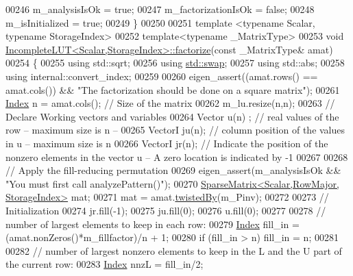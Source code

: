 \begin{DoxyCode}
00246   m\_analysisIsOk = \textcolor{keyword}{true};
00247   m\_factorizationIsOk = \textcolor{keyword}{false};
00248   m\_isInitialized = \textcolor{keyword}{true};
00249 \}
00250 
00251 \textcolor{keyword}{template} <\textcolor{keyword}{typename} Scalar, \textcolor{keyword}{typename} StorageIndex>
00252 \textcolor{keyword}{template}<\textcolor{keyword}{typename} \_MatrixType>
00253 \textcolor{keywordtype}{void} \hyperlink{group___iterative_linear_solvers___module_class_eigen_1_1_incomplete_l_u_t}{IncompleteLUT<Scalar,StorageIndex>::factorize}(\textcolor{keyword}{const} 
      \_MatrixType& amat)
00254 \{
00255   \textcolor{keyword}{using} std::sqrt;
00256   \textcolor{keyword}{using} \hyperlink{endian_8c_a3ca5ecd34b04d6a243c054ac3a57f68d}{std::swap};
00257   \textcolor{keyword}{using} std::abs;
00258   \textcolor{keyword}{using} internal::convert\_index;
00259 
00260   eigen\_assert((amat.rows() == amat.cols()) && \textcolor{stringliteral}{"The factorization should be done on a square matrix"});
00261   \hyperlink{namespace_eigen_a62e77e0933482dafde8fe197d9a2cfde}{Index} n = amat.cols();  \textcolor{comment}{// Size of the matrix}
00262   m\_lu.resize(n,n);
00263   \textcolor{comment}{// Declare Working vectors and variables}
00264   Vector u(n) ;     \textcolor{comment}{// real values of the row -- maximum size is n --}
00265   VectorI ju(n);   \textcolor{comment}{// column position of the values in u -- maximum size  is n}
00266   VectorI jr(n);   \textcolor{comment}{// Indicate the position of the nonzero elements in the vector u -- A zero location is
       indicated by -1}
00267 
00268   \textcolor{comment}{// Apply the fill-reducing permutation}
00269   eigen\_assert(m\_analysisIsOk && \textcolor{stringliteral}{"You must first call analyzePattern()"});
00270   \hyperlink{group___sparse_core___module}{SparseMatrix<Scalar,RowMajor, StorageIndex>} mat;
00271   mat = amat.\hyperlink{group___sparse_core___module_a51d4898bd6a57cc3ba543a39b102423e}{twistedBy}(m\_Pinv);
00272 
00273   \textcolor{comment}{// Initialization}
00274   jr.fill(-1);
00275   ju.fill(0);
00276   u.fill(0);
00277 
00278   \textcolor{comment}{// number of largest elements to keep in each row:}
00279   \hyperlink{namespace_eigen_a62e77e0933482dafde8fe197d9a2cfde}{Index} fill\_in = (amat.nonZeros()*m\_fillfactor)/n + 1;
00280   \textcolor{keywordflow}{if} (fill\_in > n) fill\_in = n;
00281 
00282   \textcolor{comment}{// number of largest nonzero elements to keep in the L and the U part of the current row:}
00283   \hyperlink{namespace_eigen_a62e77e0933482dafde8fe197d9a2cfde}{Index} nnzL = fill\_in/2;

\end{DoxyCode}
